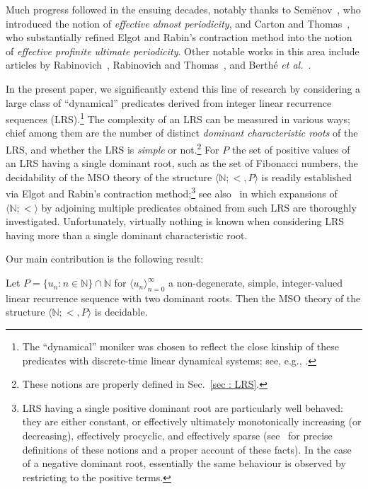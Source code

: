 \documentclass[a4paper,UKenglish,cleveref, autoref, thm-restate]{lipics-v2021}
\newcommand{\nat} {\mathbb{N}}
\begin{document}
Much progress followed in the ensuing decades, notably thanks to
Sem\"enov~\cite{semenov1984logical}, who introduced the notion of
\emph{effective almost periodicity}, and Carton
and Thomas~\cite{cartonthomas}, who substantially refined Elgot
and Rabin's contraction method into the notion of 
\emph{effective profinite ultimate periodicity}.
Other notable works in this area include articles by
Rabinovich~\cite{rabinovich}, Rabinovich and
Thomas~\cite{rabinovich2006decidable}, and Berth\'e \emph{et al.}~\cite{berthe2024decidability}.

In the present paper, we significantly extend this line of research by
considering a large class of ``dynamical'' predicates derived from
integer linear recurrence sequences (LRS)\@.\footnote{The ``dynamical''
  moniker was chosen to reflect the close kinship of these predicates
  with discrete-time linear dynamical systems; see, e.g.,
  \cite{Baier0JKLLOPW021,DCostaKMOSW22,KarimovLOPVWW22,KarimovKO022,LucaOW22,KarimovKNO023,AghamovBKOP24}.}  The complexity of an LRS can be
measured in various ways; chief among them are the number of distinct
\emph{dominant characteristic roots} of the LRS, and whether the LRS is \emph{simple} or
not.\footnote{These notions are properly defined in Sec.~\ref{sec : LRS}.}
For $P$ the set of positive values of an LRS having a single
dominant root, such as the set of Fibonacci numbers, the decidability of
the MSO theory of the structure $\langle \nat ; <,P \rangle$ is
readily established via Elgot and Rabin's contraction
method;\footnote{LRS having a single positive dominant root are particularly well
  behaved: they are either constant, or effectively ultimately
  monotonically increasing (or decreasing),
  effectively procyclic, and effectively sparse
  (see~\cite{berthe2024decidability} for precise definitions of these
  notions and a proper account of these facts). In the case of a
  negative dominant root, essentially the same behaviour is observed
  by restricting to the positive terms.} see
also~\cite{berthe2024decidability} in which expansions of $\langle
\nat ; < \rangle$ by adjoining multiple predicates obtained from such
LRS are thoroughly investigated. Unfortunately, virtually nothing is
known when considering LRS having more than a single dominant characteristic root.

Our main contribution is the following result:

\begin{theorem}\label{thm : MSO decidable}
    Let $P = \{u_n \colon n \in \nat\} \cap \nat$ for $\langle u_n
    \rangle_{n=0}^\infty$ a 
    non-degenerate, simple, integer-valued linear recurrence
    sequence with two dominant roots. 
    Then the MSO theory of the structure $\langle \nat ; < , P\rangle$ is decidable.
\end{theorem}
\end{document}
